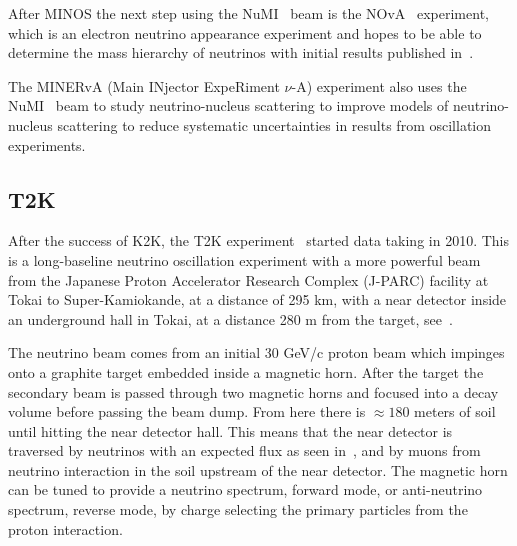 After MINOS the next step using the NuMI~\cite{19NuMI} beam is the NOvA~\cite{18nova} experiment, which is an electron neutrino appearance experiment and hopes to be able to determine the mass hierarchy of neutrinos with initial results published in~\cite{103NOVA}.

The MINERvA (Main INjector ExpeRiment $\nu$-A) experiment \cite{39minerva} also uses the NuMI~\cite{19NuMI} beam to study neutrino-nucleus scattering to improve models of neutrino-nucleus scattering to reduce systematic uncertainties in results from oscillation experiments.


\subsection{T2K}


After the success of K2K, the T2K experiment~\cite{21T2K} started data taking in 2010. This is a long-baseline neutrino oscillation experiment with a more powerful beam from the Japanese Proton Accelerator Research Complex (J-PARC) facility at Tokai to Super-Kamiokande, at a distance of 295 km, with a near detector inside an underground hall in Tokai, at a distance 280 m from the target, see~.

The neutrino beam comes from an initial 30 GeV/c proton beam which impinges onto a graphite target embedded inside a magnetic horn. After the target the secondary beam is passed through two magnetic horns and focused into a decay volume before passing the beam dump. From here there is $\approx180$ meters of soil until hitting the near detector hall. This means that the near detector is traversed by neutrinos with an expected flux as seen in~, and by muons from neutrino interaction in the soil upstream of the near detector. The magnetic horn can be tuned to provide a neutrino spectrum, forward mode, or anti-neutrino spectrum, reverse mode, by charge selecting the primary particles from the proton interaction.


